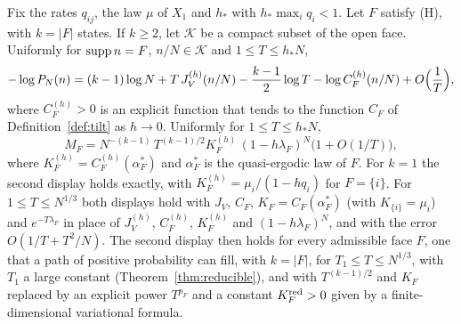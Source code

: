 \begin{introtheorem}\label{thm:A}
Fix the rates $q_{ij}$, the law $\mu$ of $X_1$ and $h_*$ with $h_*\max_iq_i<1$. Let $F$
satisfy \textup{(H)}, with $k=\lvert F\rvert$ states. If $k\ge2$, let $\mathcal K$ be a
compact subset of the open face. Uniformly for $\operatorname{supp} n=F$, $n/N\in\mathcal K$ and
$1\le T\le h_*N$,
\[
 -\log P_N(n)=(k-1)\log N+T\,J^{(h)}_V(n/N)-\frac{k-1}2\log T-\log C^{(h)}_F(n/N)
 +O\Bigl(\frac1T\Bigr),
\]
where $C^{(h)}_F>0$ is an explicit function that tends to the function $C_F$ of
Definition~\ref{def:tilt} as $h\to0$. Uniformly for $1\le T\le h_*N$,
\[
 M_F=N^{-(k-1)}\,T^{(k-1)/2}K^{(h)}_F\,(1-h\lambda_F)^N\bigl(1+O(1/T)\bigr),
\]
where $K^{(h)}_F=C^{(h)}_F(\alpha^*_F)$ and $\alpha^*_F$ is the quasi-ergodic law of
$F$. For $k=1$ the second display holds exactly, with $K^{(h)}_F=\mu_i/(1-hq_i)$ for
$F=\{i\}$. For $1\le T\le N^{1/3}$ both displays hold with $J_V$, $C_F$,
$K_F=C_F(\alpha^*_F)$ (with $K_{\{i\}}=\mu_i$) and $e^{-T\lambda_F}$ in place of $J^{(h)}_V$, $C^{(h)}_F$,
$K^{(h)}_F$ and $(1-h\lambda_F)^N$, and with the error $O(1/T+T^2/N)$. The
second display then holds for every admissible face $F$, one that a path of positive
probability can fill, with $k=|F|$, for $T_1\le T\le N^{1/3}$, with $T_1$ a large constant
(Theorem~\ref{thm:reducible}), and with $T^{(k-1)/2}$ and $K_F$
replaced by an explicit power $T^{p_F}$ and a constant $K^{\rm red}_F>0$ given by a
finite-dimensional variational formula.
\end{introtheorem}

